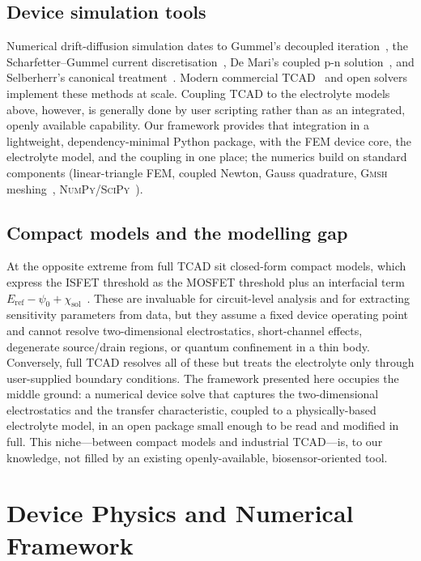 \documentclass[10pt,journal]{IEEEtran}
\begin{document}
\subsection{Device simulation tools}
Numerical drift-diffusion simulation dates to Gummel's decoupled
iteration~\cite{gummel1964}, the Scharfetter--Gummel current
discretisation~\cite{scharfetter1969}, De Mari's coupled p-n
solution~\cite{demari1968}, and Selberherr's canonical
treatment~\cite{selberherr1984}. Modern commercial TCAD~\cite{sentaurus,comsol}
and open solvers~\cite{sanchez2016,charon2020} implement these methods at scale.
Coupling TCAD to the electrolyte models above, however, is generally done by
user scripting rather than as an integrated, openly available capability. Our
framework provides that integration in a lightweight, dependency-minimal Python
package, with the FEM device core, the electrolyte model, and the coupling in one
place; the numerics build on standard components (linear-triangle FEM, coupled
Newton, Gauss quadrature, \textsc{Gmsh} meshing~\cite{geuzaine2009},
\textsc{NumPy}/\textsc{SciPy}~\cite{harris2020,virtanen2020}).

\subsection{Compact models and the modelling gap}
At the opposite extreme from full TCAD sit closed-form compact models, which
express the ISFET threshold as the MOSFET threshold plus an interfacial term
$E_{\mathrm{ref}}-\psi_0+\chi_{\mathrm{sol}}$~\cite{bergveld2003,vanhal1996}.
These are invaluable for circuit-level analysis and for extracting sensitivity
parameters from data, but they assume a fixed device operating point and cannot
resolve two-dimensional electrostatics, short-channel effects, degenerate
source/drain regions, or quantum confinement in a thin body. Conversely, full
TCAD resolves all of these but treats the electrolyte only through user-supplied
boundary conditions. The framework presented here occupies the middle ground: a
numerical device solve that captures the two-dimensional electrostatics and the
transfer characteristic, coupled to a physically-based electrolyte model, in an
open package small enough to be read and modified in full. This niche---between
compact models and industrial TCAD---is, to our knowledge, not filled by an
existing openly-available, biosensor-oriented tool.

\section{Device Physics and Numerical Framework}
\label{sec:device}
\end{document}
